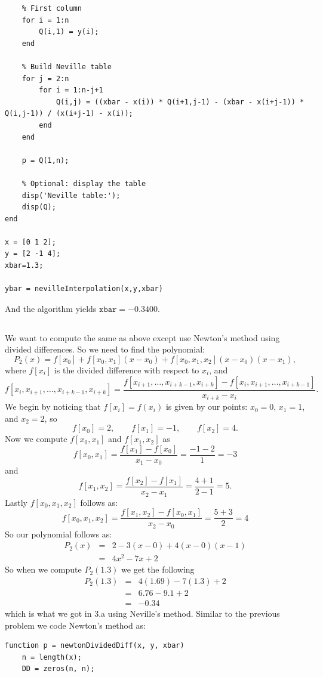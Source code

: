 \documentclass[12pt]{amsart}
\begin{document}
\begin{onehalfspace}
\begin{tiny}
\begin{verbatim}
    % First column
    for i = 1:n
        Q(i,1) = y(i);
    end

    % Build Neville table
    for j = 2:n
        for i = 1:n-j+1
            Q(i,j) = ((xbar - x(i)) * Q(i+1,j-1) - (xbar - x(i+j-1)) * Q(i,j-1)) / (x(i+j-1) - x(i));
        end
    end

    p = Q(1,n);

    % Optional: display the table
    disp('Neville table:');
    disp(Q);
end

x = [0 1 2];
y = [2 -1 4];
xbar=1.3;

ybar = nevilleInterpolation(x,y,xbar)
        \end{verbatim}
        \end{tiny}
        And the algorithm yields $\texttt{xbar} = -0.3400$.

        \subsection{}
        We want to compute the same as above except use Newton's method using divided differences.
        So we need to find the polynomial:
        \[
            P_2(x) = f[x_0] + f[x_0,x_1](x-x_0) + f[x_0,x_1,x_2](x-x_0)(x-x_1),
        \]
        where $f[x_i]$ is the divided difference with respect to $x_i$, and
        \[
            f[x_i,x_{i+1},\ldots,x_{i+k-1},x_{i+k}] = \frac{f[x_{i+1},\ldots,x_{i+k-1},x_{i+k}] - f[x_i,x_{i+1},\ldots,x_{i+k-1}]}{x_{i+k} - x_i}.
        \]
        We begin by noticing that $f[x_i] = f(x_i)$ is given by our points: $x_0=0$, $x_1=1$, and $x_2=2$, so
        \[
            f[x_0] = 2,\qquad f[x_1] = -1,\qquad f[x_2] = 4.
        \]
        Now we compute $f[x_0,x_1]$ and $f[x_1,x_2]$ as
        \[
            f[x_0,x_1] = \frac{f[x_1] - f[x_0]}{x_1 - x_0} = \frac{-1 -2}{1} = -3
        \]
        and
        \[
            f[x_1,x_2] = \frac{f[x_2] - f[x_1]}{x_2 - x_1} = \frac{4+1}{2-1} = 5.
        \]
        Lastly $f[x_0,x_1,x_2]$ follows as:
        \[
            f[x_0,x_1,x_2] = \frac{f[x_1,x_2] - f[x_0,x_1]}{x_2 - x_0} = \frac{5 + 3}{2} = 4
        \]
        So our polynomial follows as:
        \begin{eqnarray*}
            P_2(x) & = & 2 - 3(x - 0) + 4(x - 0)(x - 1)\\
             & = & 4x^2-7x+2
        \end{eqnarray*}
        So when we compute $P_2(1.3)$ we get the following
        \begin{eqnarray*}
            P_2(1.3) & = & 4(1.69) -7 (1.3) + 2 \\
            & = & 6.76 - 9.1 + 2 \\
            & = & -0.34
        \end{eqnarray*}
        which is what we got in 3.a using Neville's method.
        Similar to the previous problem we code Newton's method as:
        \begin{tiny}
        \begin{verbatim}
function p = newtonDividedDiff(x, y, xbar)
    n = length(x);
    DD = zeros(n, n);


\end{verbatim}
\end{tiny}
\end{onehalfspace}
\end{document}

